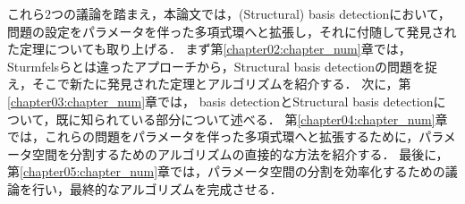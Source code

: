 \par
これら$2$つの議論を踏まえ，本論文では，(Structural) \groebner{} basis detectionにおいて，問題の設定をパラメータを伴った多項式環へと拡張し，それに付随して発見された定理についても取り上げる．
まず第\ref{chapter02:chapter_num}章では，Sturmfelsらとは違ったアプローチから，Structural \groebner{} basis detectionの問題を捉え，そこで新たに発見された定理とアルゴリズムを紹介する．
次に，第\ref{chapter03:chapter_num}章では，\groebner{} basis detectionとStructural \groebner{} basis detectionについて，既に知られている部分について述べる．
第\ref{chapter04:chapter_num}章では，これらの問題をパラメータを伴った多項式環へと拡張するために，パラメータ空間を分割するためのアルゴリズムの直接的な方法を紹介する．
最後に，第\ref{chapter05:chapter_num}章では，パラメータ空間の分割を効率化するための議論を行い，最終的なアルゴリズムを完成させる．